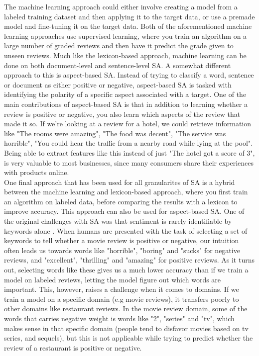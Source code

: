 \documentclass{report}
\begin{document}
The machine learning approach could either involve creating a model from a labeled training dataset and then applying it to the target data, or use a premade model and fine-tuning it on the target data. Both of the aforementioned machine learning approaches use supervised learning, where you train an algorithm on a large number of graded reviews and then have it predict the grade given to unseen reviews. Much like the lexicon-based approach, machine learning can be done on both document-level and sentence-level SA. A somewhat different approach to this is aspect-based SA. Instead of trying to classify a word, sentence or document as either positive or negative, aspect-based SA is tasked with identifying the polarity of a specific aspect associated with a target. One of the main contributions of aspect-based SA is that in addition to learning whether a review is positive or negative, you also learn which aspects of the review that made it so. If we're looking at a review for a hotel, we could retrieve information like "The rooms were amazing", "The food was decent", "The service was horrible", "You could hear the traffic from a nearby road while lying at the pool". Being able to extract features like this instead of just "The hotel got a score of 3", is very valuable to most businesses, since many consumers share their experiences with products online.\\
One final approach that has been used for all granularites of SA is a hybrid between the machine learning and lexicon-based approach, where you first train an algorithm on labeled data, before comparing the results with a lexicon to improve accuracy. This approach can also be used for aspect-based SA.
One of the original challenges with SA was that sentiment is rarely identifiable by keywords alone \cite{pang-etal-2002-thumbs}. When humans are presented with the task of selecting a set of keywords to tell whether a movie review is positive or negative, our intuition often leads us towards words like "horrible", "boring" and "sucks" for negative reviews, and "excellent", "thrilling" and "amazing" for positive reviews. As it turns out, selecting words like these gives us a much lower accuracy than if we train a model on labeled reviews, letting the model figure out which words are important. This, however, raises a challenge when it comes to domains. If we train a model on a specific domain (e.g movie reviews), it transfers poorly to other domains like restaurant reviews. In the movie review domain, some of the words that carries negative weight is words like "2", "series" and "tv", which makes sense in that specific domain (people tend to disfavor movies based on tv series, and sequels), but this is not applicable while trying to predict whether the review of a restaurant is positive or negative. 
\end{document}
